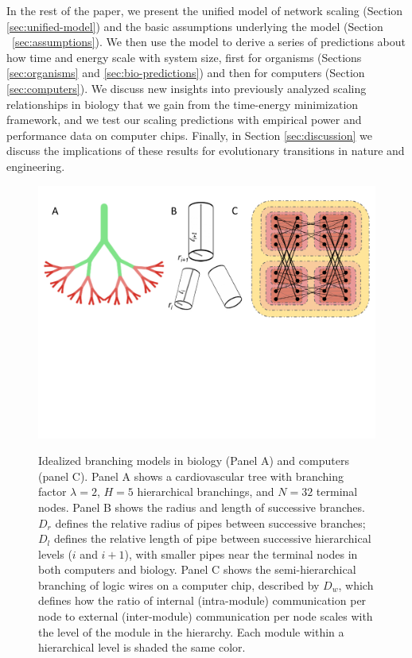\documentclass[12pt]{article}
\begin{document}
In the rest of the paper, we present the unified model of network scaling
(Section \ref{sec:unified-model}) and the basic assumptions underlying the
model (Section ~\ref{sec:assumptions}).  We then use the model to derive a
series of predictions about how time and energy scale with system size, first
for organisms (Sections \ref{sec:organisms} and \ref{sec:bio-predictions}) and then for computers (Section
\ref{sec:computers}). We discuss new insights into previously analyzed
scaling relationships in biology that we gain from the time-energy minimization
framework, and we test our scaling predictions with empirical power and performance
data on computer chips.  Finally, in Section \ref{sec:discussion}  we discuss
the implications of these results for evolutionary transitions in nature and
engineering.

\begin{figure}[!h]
\centering
\includegraphics[width=\textwidth]{Figures/Figure1Draft3.pdf}
\label{fig:firstfig}

\caption{Idealized branching models in biology (Panel A) and computers
  (panel C). Panel A shows a cardiovascular tree with branching factor $\lambda
  = 2$, $H = 5$ hierarchical branchings, and $N = 32$ terminal
  nodes. Panel B shows the
  radius and length of successive branches. $D_r$ defines the relative radius of pipes between
  successive branches; $D_l$ defines the relative length of pipe
  between successive hierarchical levels ($i$ and $i+1$), with smaller pipes near the
  terminal nodes in both computers and biology. Panel C shows the
  semi-hierarchical branching of logic wires on a computer chip,
  described by $D_w$, which
  defines how the ratio of internal (intra-module) communication per
  node to external (inter-module) communication per node scales with
  the level of the module in the hierarchy. Each module within a
  hierarchical level is shaded the same color.}

\end{figure}
\end{document}
